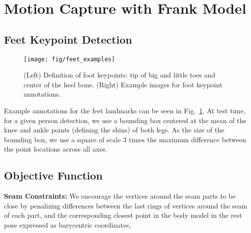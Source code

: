 \documentclass[11pt,english]{article}
\begin{document}
\section{Motion Capture with Frank Model}

\subsection{Feet Keypoint Detection}
\begin{figure}[th]
    \centering
    \texttt{[image: fig/feet\_examples]}
    \caption{ (Left) Definition of foot keypoints: tip of big and little toes and center of the heel bone.  (Right) Example images for foot keypoint annotations.}
    \label{fig:feet_label}
\end{figure}

Example annotations for the feet landmarks can be seen in Fig.~\ref{fig:feet_label}. At test time, for a given person detection, we use a bounding box centered at the mean of the knee and ankle points (defining the shins) of both legs. As the size of the bounding box, we use a square of scale $3$ times the maximum difference between the point locations across all axes. 

\subsection{Objective Function}
\textbf{Seam Constraints:}  We encourage the vertices around the seam parts to be close by penalizing differences between the last  rings of vertices around the seam of each part, and the corresponding closest point in the body model in the rest pose expressed as barycentric coordinates,
\end{document}
